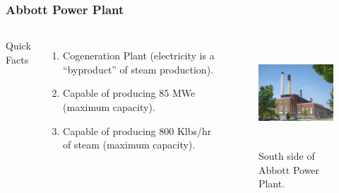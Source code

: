     \begin{frame}
  \frametitle{Abbott Power Plant}
        \begin{columns}
                \column[t]{5cm}
                Quick Facts \cite{noauthor_abbott_nodate}
                \begin{enumerate}
                    \item Cogeneration Plant (electricity is a ``byproduct'' of steam production).
                    \item Capable of producing 85 MWe (maximum capacity).
                    \item Capable of producing 800 Klbs/hr of steam (maximum capacity).
                \end{enumerate}
                \column[t]{5cm}
        \begin{figure}[htbp!]
        \begin{center}
      \includegraphics[height=4cm]{./images/abbott.jpg}
    \end{center}
          \caption*{South side of Abbott Power Plant.}
    \label{fig:abbott}
  \end{figure}
        \end{columns}
\end{frame}


